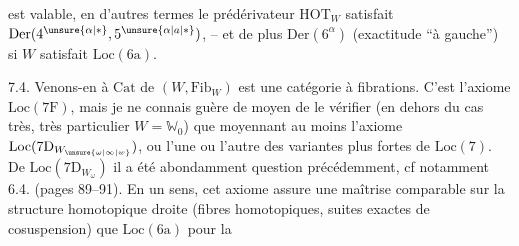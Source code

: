 est valable, en d'autres termes le prédérivateur $\mathrm{HOT}_W$ satisfait $\mathrm{Der}(4^{\unsure{\alpha|*}},5^{\unsure{\alpha|a|*}})$, -- et de plus $\mathrm{Der}(6^\alpha)$ (exactitude ``à gauche'') si $W$ satisfait $\mathrm{Loc}(6\mathrm{a})$.


7.4. Venons-en à   $\mathrm{Cat}$  de $(W,\mathrm{Fib}_W)$ est une catégorie à fibrations. C'est l'axiome \uline{$\mathrm{Loc}(7\mathrm{F})$}, mais je ne connais guère de moyen de le vérifier (en dehors du cas très, très particulier $W=\mathbb{W}_0$) que moyennant  au moins l'axiome \uline{$\mathrm{Loc}(7\mathrm{D}_{W_{\unsure{\omega|\infty|w}}})$}, ou l'une ou l'autre des variantes plus fortes de $\mathrm{Loc}(7)$. De $\mathrm{Loc}(7\mathrm{D}_{W_\omega})$ il a été abondamment question  précédemment, cf notamment 6.4. (pages 89--91). En un sens, cet axiome assure une maîtrise comparable sur la structure homotopique droite (fibres homotopiques, suites exactes de cosuspension) que $\mathrm{Loc}(6\mathrm{a})$ pour la
